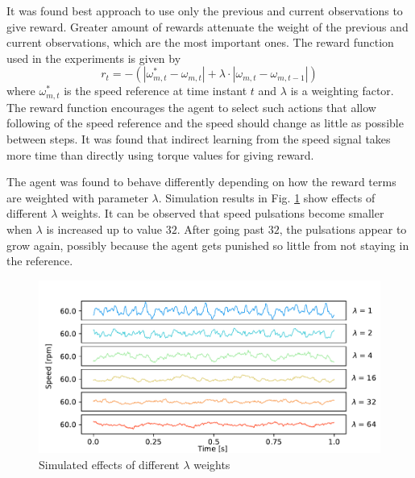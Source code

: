 It was found best approach to use only the previous and current observations to give reward. Greater amount of rewards attenuate the weight of the previous and current observations, which are the most important ones. The reward function used in the experiments is given by
\begin{equation}
    r_t = -(|\omega^{*}_{m, t} - \omega_{m, t}| + \lambda \cdot |\omega_{m, t} - \omega_{m, t-1}|)
    \label{Eq:reward-function}
\end{equation}
where $\omega^{*}_{m, t}$ is the speed reference at time instant $t$ and $\lambda$ is a weighting factor. The reward function encourages the agent to select such actions that allow following of the speed reference and the speed should change as little as possible between steps. It was found that indirect learning from the speed signal takes more time than directly using torque values for giving reward.

The agent was found to behave differently depending on how the reward terms are weighted with parameter $\lambda$. Simulation results in Fig. \ref{fig:lambda} show effects of different $\lambda$ weights. It can be observed that speed pulsations become smaller when $\lambda$ is increased up to value $32$. After going past $32$, the pulsations appear to grow again, possibly because the agent gets punished so little from not staying in the reference.
\begin{figure}[htb] 
    \centering
    \includegraphics[width=\textwidth]{images/lambda_multiplier.pdf}
    \caption{Simulated effects of different $\lambda$ weights}
    \label{fig:lambda}
\end{figure}


